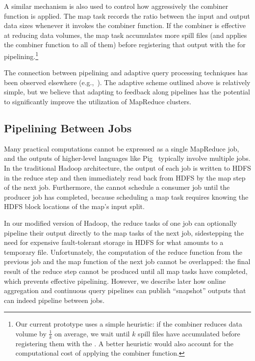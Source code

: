 A similar mechanism is also used to control how aggressively the combiner
function is applied.  The map task records the ratio between the input and
output data sizes whenever it invokes the combiner function.  If the combiner
is effective at reducing data volumes, the map task accumulates more spill
files (and applies the combiner function to all of them) before registering
that output with the {\TT} for pipelining.\footnote{Our current prototype uses
a simple heuristic: if the combiner reduces data volume by $\frac{1}{k}$ on
average, we wait until $k$ spill files have accumulated before registering them
with the {\TT}.  A better heuristic would also account for the computational
cost of applying the combiner function.}

The connection between pipelining and adaptive query processing techniques has
been observed elsewhere (e.g.,~\cite{eddies, bamboo}).  The adaptive scheme
outlined above is relatively simple, but we believe that adapting to feedback
along pipelines has the potential to significantly improve the utilization of
MapReduce clusters.

\subsection{Pipelining Between Jobs}
\label{ch:hop:sec:inter-pipe}

Many practical computations cannot be expressed as a single MapReduce job, and
the outputs of higher-level languages like Pig~\cite{pig-sigmod} typically involve
multiple jobs.  In the traditional Hadoop architecture, the output of each job
is written to HDFS in the reduce step and then immediately read back from HDFS
by the map step of the next job. Furthermore, the {\JT} cannot schedule a
consumer job until the producer job has completed, because scheduling a map task
requires knowing the HDFS block locations of the map's input split.

In our modified version of Hadoop, the reduce tasks of one job can optionally
pipeline their output directly to the map tasks of the next job, sidestepping
the need for expensive fault-tolerant storage in HDFS for what amounts to a
temporary file.  Unfortunately, the computation of the reduce function from the
previous job and the map function of the next job cannot be overlapped: the
final result of the reduce step cannot be produced until all map tasks have
completed, which prevents effective pipelining.  However, we describe later how
online aggregation and continuous query pipelines can publish ``snapshot''
outputs that can indeed pipeline between jobs.

